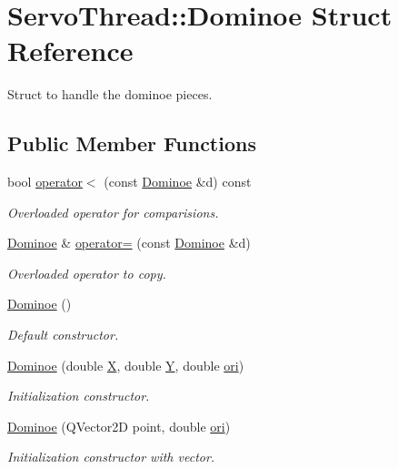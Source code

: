 \hypertarget{a00002}{}\section{Servo\+Thread\+:\+:Dominoe Struct Reference}
\label{a00002}


Struct to handle the dominoe pieces.  


\subsection*{Public Member Functions}
\begin{DoxyCompactItemize}
\item 
bool \hyperlink{a00002_ab2bda7d8d5ea90e61e3904c87bf01245}{operator$<$} (const \hyperlink{a00002}{Dominoe} \&d) const 
\begin{DoxyCompactList}\small\item\em Overloaded operator for comparisions. \end{DoxyCompactList}\item 
\hyperlink{a00002}{Dominoe} \& \hyperlink{a00002_af7ad901ee679234b8826af58a13fba45}{operator=} (const \hyperlink{a00002}{Dominoe} \&d)
\begin{DoxyCompactList}\small\item\em Overloaded operator to copy. \end{DoxyCompactList}\item 
\hyperlink{a00002_aa9c033e180ad43bfe5127e96cef77b9d}{Dominoe} ()
\begin{DoxyCompactList}\small\item\em Default constructor. \end{DoxyCompactList}\item 
\hyperlink{a00002_a9cd75d2de5cec349594c40c321c204c4}{Dominoe} (double \hyperlink{a00002_a8caa44969c79e0e46576da349957975b}{X}, double \hyperlink{a00002_ae7711996c8204586b6d8a5e657c4b06a}{Y}, double \hyperlink{a00002_a451efc4d2eb2f1dd10006c6c49846e8d}{ori})
\begin{DoxyCompactList}\small\item\em Initialization constructor. \end{DoxyCompactList}\item 
\hyperlink{a00002_aea355d23a1420ef5206bdcf6d60070da}{Dominoe} (Q\+Vector2\+D point, double \hyperlink{a00002_a451efc4d2eb2f1dd10006c6c49846e8d}{ori})
\begin{DoxyCompactList}\small\item\em Initialization constructor with vector. \end{DoxyCompactList}\end{DoxyCompactItemize}
